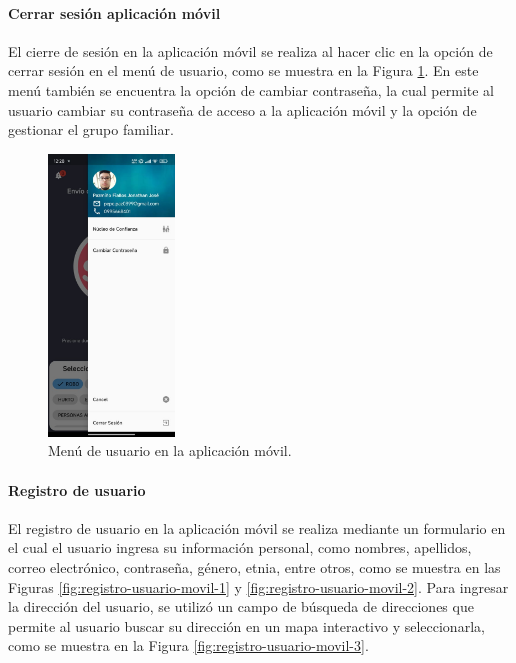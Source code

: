 \paragraph{Cerrar sesión aplicación móvil}

El cierre de sesión en la aplicación móvil se realiza al hacer clic en la opción de cerrar sesión en el menú de usuario, como se muestra
en la Figura \ref{fig:menu-usuario-movil}. En este menú también se encuentra la opción de cambiar contraseña, la cual permite al usuario
cambiar su contraseña de acceso a la aplicación móvil y la opción de gestionar el grupo familiar.

\begin{figure}[H]
    \centering
    \includegraphics[width=0.3\textwidth]{chapters/III-resultados-y-discusion/resources/images/menu-usuario-movil.png}
    \caption{Menú de usuario en la aplicación móvil.}
    \label{fig:menu-usuario-movil}
\end{figure}

\paragraph{Registro de usuario}
El registro de usuario en la aplicación móvil se realiza mediante un formulario en el cual el usuario ingresa su información personal,
como nombres, apellidos, correo electrónico, contraseña, género, etnia, entre otros, como se muestra en las Figuras \ref{fig:registro-usuario-movil-1}
y \ref{fig:registro-usuario-movil-2}. Para ingresar la dirección del usuario, se utilizó un campo de búsqueda de direcciones que permite
al usuario buscar su dirección en un mapa interactivo y seleccionarla, como se muestra en la Figura \ref{fig:registro-usuario-movil-3}.

